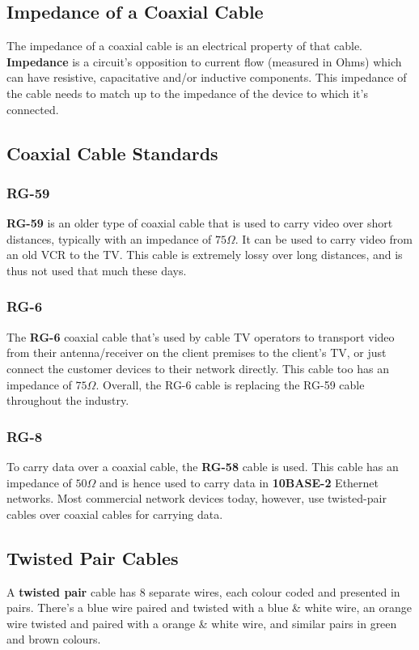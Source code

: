 \subsection{Impedance of a Coaxial Cable}
The impedance of a coaxial cable is an electrical property of that cable. \textbf{Impedance} is a circuit's opposition to current flow (measured in Ohms) which can have resistive, capacitative and/or inductive components. This impedance of the cable needs to match up to the impedance of the device to which it's connected. 

\subsection{Coaxial Cable Standards}
\subsubsection{RG-59}
\vspace{-10pt}
\textbf{RG-59} is an older type of coaxial cable that is used to carry video over short distances, typically with an impedance of $75 \Omega$. It can be used to carry video from an old VCR to the TV. This cable is extremely lossy over long distances, and is thus not used that much these days. 

\subsubsection{RG-6}
\vspace{-10pt}
The \textbf{RG-6} coaxial cable that's used by cable TV operators to transport video from their antenna/receiver on the client premises to the client's TV, or just connect the customer devices to their network directly. This cable too has an impedance of $75\Omega$. Overall, the RG-6 cable is replacing the RG-59 cable throughout the industry. 

\subsubsection{RG-8}
\vspace{-10pt}
To carry data over a coaxial cable, the \textbf{RG-58} cable is used. This cable has an impedance of $50\Omega$ and is hence used to carry data in \textbf{10BASE-2} Ethernet networks. Most commercial network devices today, however, use twisted-pair cables over coaxial cables for carrying data. 

\subsection{Twisted Pair Cables}
A \textbf{twisted pair} cable has 8 separate wires, each colour coded and presented in pairs. There's a blue wire paired and twisted with a blue \& white wire, an orange wire twisted and paired with a orange \& white wire, and similar pairs in green and brown colours. 

